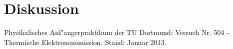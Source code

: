 \section{Diskussion}
	\label{diskussion}

\begin{thebibliography}{9}
	 Physikalisches Anf"angerpraktikum der TU Dortmund: Versuch Nr. 504 - Thermische Elektronenemission. Stand: Januar 2013.

\end{thebibliography}
